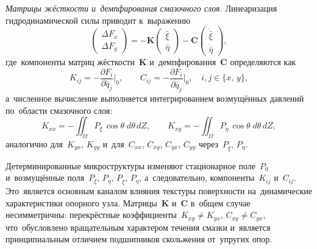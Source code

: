 \textit{Матрицы жёсткости и~демпфирования смазочного слоя.}
Линеаризация гидродинамической силы приводит к~выражению
\begin{equation}
  \begin{pmatrix} \Delta F_x \\ \Delta F_y \end{pmatrix}
  = -\mathbf{K}
  \begin{pmatrix} \bar\xi \\ \bar\eta \end{pmatrix}
  - \mathbf{C}
  \begin{pmatrix} \dot{\bar\xi} \\ \dot{\bar\eta} \end{pmatrix},
  \label{eq:linearized_force}
\end{equation}
где~компоненты матриц жёсткости~$\mathbf{K}$ и~демпфирования~$\mathbf{C}$ определяются как
\begin{equation}
  K_{ij} = -\frac{\partial F_i}{\partial \bar{q}_j}\bigg|_0, \qquad
  C_{ij} = -\frac{\partial F_i}{\partial \dot{\bar{q}}_j}\bigg|_0,
  \quad i,j \in \{x,\,y\},
  \label{eq:KC_def}
\end{equation}
а~численное вычисление выполняется интегрированием возмущённых давлений по~области смазочного слоя:
\begin{equation}
  K_{xx} = -\iint_\Omega P_{\xi}\,\cos\theta\;d\theta\,dZ, \qquad
  K_{xy} = -\iint_\Omega P_{\eta}\,\cos\theta\;d\theta\,dZ,
  \label{eq:K_integrals}
\end{equation}
аналогично для~$K_{yx}$, $K_{yy}$ и~для~$C_{xx}$, $C_{xy}$, $C_{yx}$, $C_{yy}$ через~$P_{\dot\xi}$, $P_{\dot\eta}$.

Детерминированные микроструктуры изменяют стационарное поле~$P_0$ и~возмущённые поля~$P_{\xi}$, $P_{\eta}$, $P_{\dot\xi}$, $P_{\dot\eta}$, а~следовательно, компоненты~$K_{ij}$ и~$C_{ij}$. Это~является основным каналом влияния текстуры поверхности на~динамические характеристики опорного узла. Матрицы~$\mathbf{K}$ и~$\mathbf{C}$ в~общем случае несимметричны: перекрёстные коэффициенты~$K_{xy} \neq K_{yx}$, $C_{xy} \neq C_{yx}$, что~обусловлено вращательным характером течения смазки и~является принципиальным отличием подшипников скольжения от~упругих опор.


